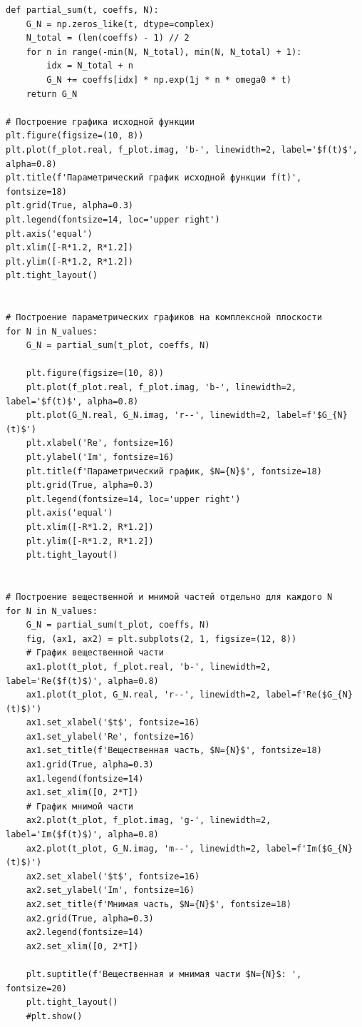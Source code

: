 \documentclass[a4paper, 12pt]{article}
\begin{document}
\begin{verbatim}
def partial_sum(t, coeffs, N):
    G_N = np.zeros_like(t, dtype=complex)
    N_total = (len(coeffs) - 1) // 2
    for n in range(-min(N, N_total), min(N, N_total) + 1):
        idx = N_total + n
        G_N += coeffs[idx] * np.exp(1j * n * omega0 * t)
    return G_N

# Построение графика исходной функции
plt.figure(figsize=(10, 8))
plt.plot(f_plot.real, f_plot.imag, 'b-', linewidth=2, label='$f(t)$', alpha=0.8)
plt.title(f'Параметрический график исходной функции f(t)', fontsize=18)
plt.grid(True, alpha=0.3)
plt.legend(fontsize=14, loc='upper right')
plt.axis('equal')
plt.xlim([-R*1.2, R*1.2])
plt.ylim([-R*1.2, R*1.2])
plt.tight_layout()


# Построение параметрических графиков на комплексной плоскости
for N in N_values:
    G_N = partial_sum(t_plot, coeffs, N)

    plt.figure(figsize=(10, 8))
    plt.plot(f_plot.real, f_plot.imag, 'b-', linewidth=2, label='$f(t)$', alpha=0.8)
    plt.plot(G_N.real, G_N.imag, 'r--', linewidth=2, label=f'$G_{N}(t)$')
    plt.xlabel('Re', fontsize=16)
    plt.ylabel('Im', fontsize=16)
    plt.title(f'Параметрический график, $N={N}$', fontsize=18)
    plt.grid(True, alpha=0.3)
    plt.legend(fontsize=14, loc='upper right')
    plt.axis('equal')
    plt.xlim([-R*1.2, R*1.2])
    plt.ylim([-R*1.2, R*1.2])
    plt.tight_layout()


# Построение вещественной и мнимой частей отдельно для каждого N
for N in N_values:
    G_N = partial_sum(t_plot, coeffs, N)
    fig, (ax1, ax2) = plt.subplots(2, 1, figsize=(12, 8))
    # График вещественной части
    ax1.plot(t_plot, f_plot.real, 'b-', linewidth=2, label='Re($f(t)$)', alpha=0.8)
    ax1.plot(t_plot, G_N.real, 'r--', linewidth=2, label=f'Re($G_{N}(t)$)')
    ax1.set_xlabel('$t$', fontsize=16)
    ax1.set_ylabel('Re', fontsize=16)
    ax1.set_title(f'Вещественная часть, $N={N}$', fontsize=18)
    ax1.grid(True, alpha=0.3)
    ax1.legend(fontsize=14)
    ax1.set_xlim([0, 2*T])
    # График мнимой части
    ax2.plot(t_plot, f_plot.imag, 'g-', linewidth=2, label='Im($f(t)$)', alpha=0.8)
    ax2.plot(t_plot, G_N.imag, 'm--', linewidth=2, label=f'Im($G_{N}(t)$)')
    ax2.set_xlabel('$t$', fontsize=16)
    ax2.set_ylabel('Im', fontsize=16)
    ax2.set_title(f'Мнимая часть, $N={N}$', fontsize=18)
    ax2.grid(True, alpha=0.3)
    ax2.legend(fontsize=14)
    ax2.set_xlim([0, 2*T])

    plt.suptitle(f'Вещественная и мнимая части $N={N}$: ', fontsize=20)
    plt.tight_layout()
    #plt.show()


\end{verbatim}
\end{document}
